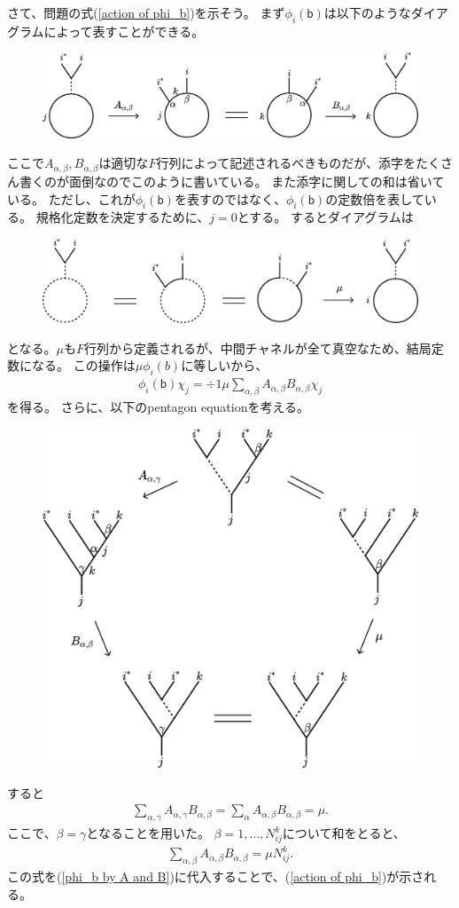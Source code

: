 \documentclass{jlreq}
\begin{document}
さて、問題の式(\ref{action of phi_b})を示そう。
まず$ϕ_i(𝖻)$は以下のようなダイアグラムによって表すことができる。
\begin{figure}[H]
    \centering
    \includegraphics[width=0.8\hsize]{phi_a chi_j}
\end{figure}
ここで$A_{α, β}, B_{α, β}$は適切な$F$行列によって記述されるべきものだが、添字をたくさん書くのが面倒なのでこのように書いている。
また添字に関しての和は省いている。
ただし、これが$ϕ_i(𝖻)$を表すのではなく、$ϕ_i(𝖻)$の定数倍を表している。
規格化定数を決定するために、$j=0$とする。
するとダイアグラムは
\begin{figure}[H]
    \centering
    \includegraphics[width=0.8\hsize]{phi_a chi_0}
\end{figure}
となる。$μ$も$F$行列から定義されるが、中間チャネルが全て真空なため、結局定数になる。
この操作は$μϕ_i(b)$に等しいから、
\begin{align}
    ϕ_i(𝖻)χ_j = ÷1{μ} ∑_{α, β} A_{α, β}B_{α, β} χ_j
    \label{phi_b by A and B}
\end{align}
を得る。
さらに、以下のpentagon equationを考える。
\begin{figure}[H]
    \centering
    \includegraphics[width=0.6\hsize]{pentagon}
\end{figure}
すると
\begin{align}
    ∑_{α, γ}A_{α,γ}B_{α,β} = ∑_{α}A_{α, β}B_{α, β}
    = μ.
\end{align}
ここで、$β=γ$となることを用いた。
$β=1,…,N_{ij}^k$について和をとると、
\begin{align}
    ∑_{α, β}A_{α, β}B_{α, β} = μN_{ij}^k.
\end{align}
この式を(\ref{phi_b by A and B})に代入することで、(\ref{action of phi_b})が示される。
\end{document}

